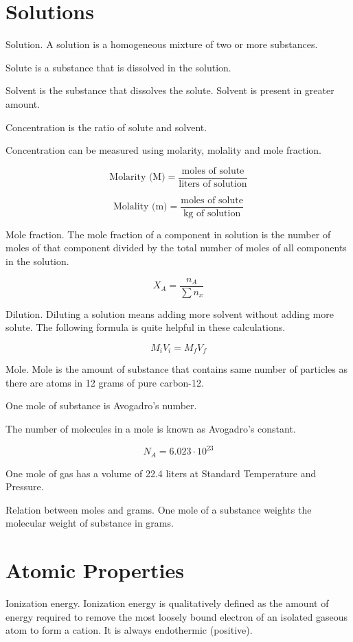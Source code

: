 \documentclass[oneside]{book} %
\theoremstyle{plain}
\begin{document}
\chapter{Solutions}

Solution. A solution is a homogeneous mixture of two or more substances.

Solute is a substance that is dissolved in the solution.

Solvent is the substance that dissolves the solute. Solvent is present in
greater amount.

Concentration is the ratio of solute and solvent.

Concentration can be measured using molarity, molality and mole fraction.

\[\text{Molarity (M)} = \frac{\text{moles of solute}}{\text{liters of
solution}}\]

\[\text{Molality (m)} = \frac{\text{moles of solute}}{\text{kg of solution}}\]

Mole fraction. The mole fraction of a component in solution is the number of
moles of that component divided by the total number of moles of all components
in the solution.

\[X_A = \frac{n_A}{\sum{n_x}}\]

Dilution. Diluting a solution means adding more solvent without adding more
solute.
The following formula is quite helpful in these calculations.

\[M_i V_i = M_f V_f\]

Mole. Mole is the amount of substance that contains same number of particles as
there are atoms in 12 grams of pure carbon-12.

One mole of substance is Avogadro's number.

The number of molecules in a mole is known as Avogadro's constant.

\[N_A = 6.023 \cdot 10^{23}\]

One mole of gas has a volume of 22.4 liters at Standard Temperature and
Pressure.

Relation between moles and grams.
One mole of a substance weights the molecular weight of substance in grams.


\chapter{Atomic Properties}

Ionization energy. Ionization energy is qualitatively defined as the amount of
energy required to remove the most loosely bound electron of an isolated
gaseous atom to form a cation. It is always endothermic (positive).
\end{document}
